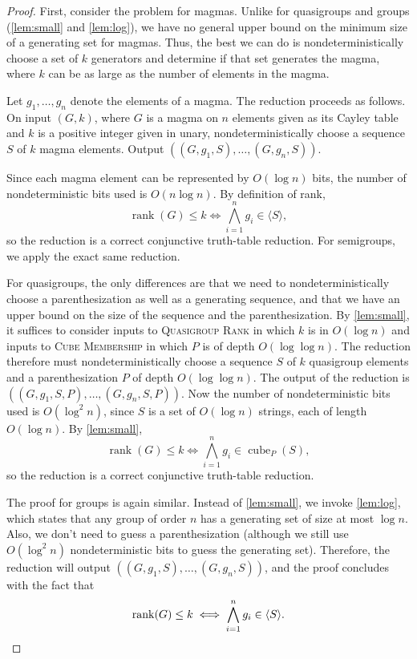 \documentclass{article}
\newcommand{\gen}[1]{\langle #1 \rangle}
\DeclareMathOperator{\cube}{cube}
\DeclareMathOperator{\rank}{rank}
\begin{document}
\begin{proof}
  First, consider the problem for magmas.
  Unlike for quasigroups and groups (\autoref{lem:small} and \autoref{lem:log}), we have no general upper bound on the minimum size of a generating set for magmas.
  Thus, the best we can do is nondeterministically choose a set of $k$ generators and determine if that set generates the magma, where $k$ can be as large as the number of elements in the magma.

  Let $g_1, \dotsc, g_n$ denote the elements of a magma.
  The reduction proceeds as follows.
  On input $(G, k)$, where $G$ is a magma on $n$ elements given as its Cayley table and $k$ is a positive integer given in unary, nondeterministically choose a sequence $S$ of $k$ magma elements.
  Output $((G, g_1, S), \dotsc, (G, g_n, S))$.

  Since each magma element can be represented by $O(\log n)$ bits, the number of nondeterministic bits used is $O(n \log n)$.
  By definition of rank,
  \begin{equation*}
    \rank(G) \leq k \iff \bigwedge_{i = 1}^n g_i \in \gen{S},
  \end{equation*}
  so the reduction is a correct conjunctive truth-table reduction.
  For semigroups, we apply the exact same reduction.

  For quasigroups, the only differences are that we need to nondeterministically choose a parenthesization as well as a generating sequence, and that we have an upper bound on the size of the sequence and the parenthesization.
  By \autoref{lem:small}, it suffices to consider inputs to \textsc{Quasigroup Rank} in which $k$ is in $O(\log n)$ and inputs to \textsc{Cube Membership} in which $P$ is of depth $O(\log \log n)$.
  The reduction therefore must nondeterministically choose a sequence $S$ of $k$ quasigroup elements and a parenthesization $P$ of depth $O(\log \log n)$.
  The output of the reduction is $((G, g_1, S, P), \dotsc, (G, g_n, S, P))$.
  Now the number of nondeterministic bits used is $O(\log^2 n)$, since $S$ is a set of $O(\log n)$ strings, each of length $O(\log n)$.
  By \autoref{lem:small},
  \begin{equation*}
    \rank(G) \leq k \iff \bigwedge_{i = 1}^n g_i \in \cube_P(S),
  \end{equation*}
  so the reduction is a correct conjunctive truth-table reduction.

  The proof for groups is again similar.
  Instead of \autoref{lem:small}, we invoke \autoref{lem:log}, which states that any group of order $n$ has a generating set of size at most $\log n$.
  Also, we don't need to guess a parenthesization (although we still use $O(\log^2 n)$ nondeterministic bits to guess the generating set).
  Therefore, the reduction will output $((G, g_1, S), \dotsc, (G, g_n, S))$, and the proof concludes with the fact that
  \begin{equation*}
    \rank(G) \leq k \iff \bigwedge_{i = 1}^n g_i \in \gen{S}.
    \qedhere
  \end{equation*}
\end{proof}
\end{document}
